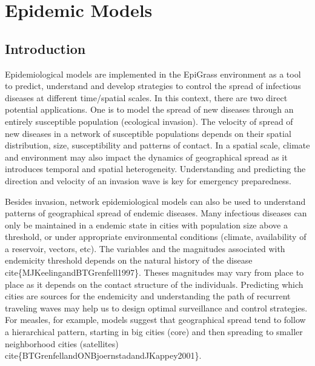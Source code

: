 \documentclass[letterpaper,10pt,english]{sphinxmanual}
\begin{document}
\chapter{Epidemic Models}
\label{\detokenize{intromodels:epidemic-models}}\label{\detokenize{intromodels::doc}}
\ignorespaces 

\section{Introduction}
\label{\detokenize{intromodels:introduction}}\label{\detokenize{intromodels:index-0}}
\ignorespaces 
Epidemiological models are implemented in the EpiGrass environment as a tool to predict, understand and develop strategies to control the spread of infectious diseases at different time/spatial scales. In this context, there are two direct potential applications. One is to model the spread of new diseases through an entirely susceptible population (ecological invasion). The velocity of spread of new diseases in a network of susceptible populations depends on their spatial distribution, size, susceptibility and patterns of contact. In a spatial scale, climate and environment may also impact the dynamics of geographical spread as it introduces temporal and spatial heterogeneity. Understanding and predicting the direction and velocity of an invasion wave is key for emergency preparedness.

Besides invasion, network epidemiological models can also be used to understand patterns of geographical spread of endemic diseases. Many infectious diseases can only be maintained in a endemic state in cities with population size above a threshold, or under appropriate environmental conditions (climate, availability of a reservoir, vectors, etc). The variables and the magnitudes associated with endemicity threshold depends on the natural history of the disease cite\{MJKeelingandBTGrenfell1997\}. Theses magnitudes may vary from place to place as it depends on the contact structure of the individuals. Predicting which cities are sources for the endemicity and understanding the path of recurrent traveling waves may help us to design optimal surveillance and control strategies. For measles, for example, models suggest that geographical spread tend to follow a hierarchical pattern, starting in big cities (core) and then spreading to smaller neighborhood cities (satellites) cite\{BTGrenfellandONBjoernstadandJKappey2001\}.
\end{document}
